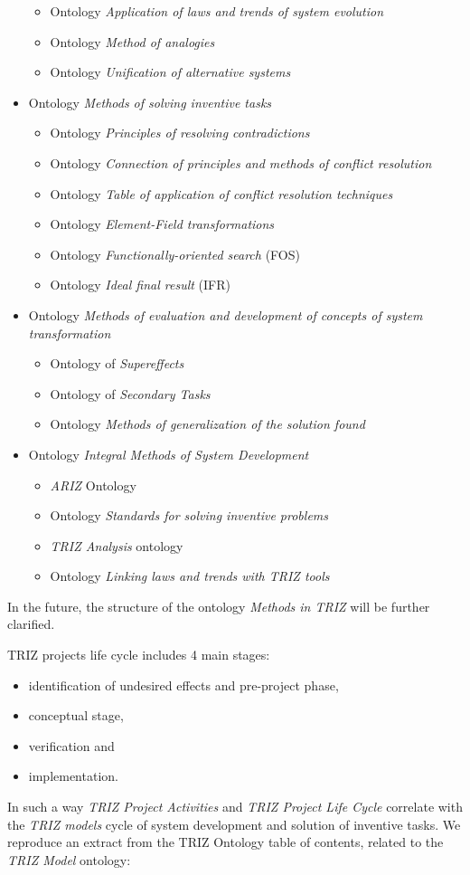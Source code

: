 \documentclass[11pt,a4paper]{article}
\begin{document}
\begin{itemize}
\begin{itemize}[noitemsep]
  \item Ontology \emph{Application of laws and trends of system evolution}
  \item Ontology \emph{Method of analogies}
  \item Ontology \emph{Unification of alternative systems}
  \end{itemize}
\item Ontology \emph{Methods of solving inventive tasks}
  \begin{itemize}[noitemsep]
  \item Ontology \emph{Principles of resolving contradictions}
  \item Ontology \emph{Connection of principles and methods of conflict
    resolution} 
  \item Ontology \emph{Table of application of conflict resolution techniques} 
  \item Ontology \emph{Element-Field transformations}
  \item Ontology \emph{Functionally-oriented search} (FOS)
  \item Ontology \emph{Ideal final result} (IFR)
  \end{itemize}
\item Ontology \emph{Methods of evaluation and development of concepts of
  system transformation}
  \begin{itemize}[noitemsep]
  \item Ontology of \emph{Supereffects}
  \item Ontology of \emph{Secondary Tasks}
  \item Ontology \emph{Methods of generalization of the solution found}
  \end{itemize}
\item Ontology \emph{Integral Methods of System Development}
  \begin{itemize}[noitemsep]
  \item \emph{ARIZ} Ontology
  \item Ontology \emph{Standards for solving inventive problems}
  \item \emph{TRIZ Analysis} ontology
  \item Ontology \emph{Linking laws and trends with TRIZ tools}
  \end{itemize}
\end{itemize}
In the future, the structure of the ontology \emph{Methods in TRIZ} will be
further clarified.

TRIZ projects life cycle includes 4 main stages:
\begin{itemize}[noitemsep]
\item identification of undesired effects and pre-project phase,
\item conceptual stage,
\item verification and
\item implementation.
\end{itemize}
In such a way \emph{TRIZ Project Activities} and \emph{TRIZ Project Life
  Cycle} correlate with the \emph{TRIZ models} cycle of system development and
solution of inventive tasks. We reproduce an extract from the TRIZ Ontology
table of contents, related to the \emph{TRIZ Model} ontology:
\end{document}
